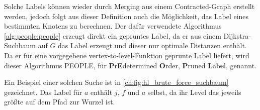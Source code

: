 Solche Labels können wieder durch Merging aus einem Contracted-Graph erstellt werden, jedoch folgt aus dieser Definition auch die Möglichkeit, das Label eines bestimmten Knotens zu berechnen.
Der dafür verwendete Algorithmus \ref{alg:people:people} erzeugt direkt ein gepruntes Label, da er aus einem Dijkstra-Suchbaum auf $G$ das Label erzeugt und dieser nur optimale Distanzen enthält.
Da er für eine vorgegebene vertex-to-level-Funktion geprunte Label liefert, wird dieser Algorithmus PEOPLE, für \textbf{P}r\textbf{E}determined \textbf{O}rder, \textbf{P}runed \textbf{L}ab\textbf{e}l, genannt.

Ein Beispiel einer solchen Suche ist in \autoref{ch:fig:hl_brute_force_suchbaum} gezeichnet.
Das Label für $a$ enthält $j$, $f$ und $a$ selbst, da ihr Level das jeweils größte auf dem Pfad zur Wurzel ist.

